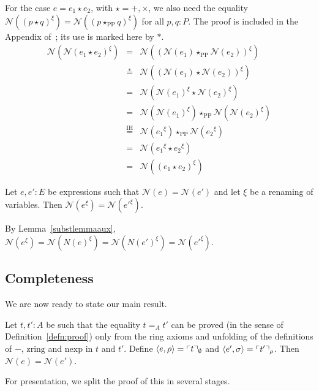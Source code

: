 \documentclass[numreferences]{kluwer}
\newcommand{\N}{\ensuremath{\mathcal{N}}}
\newcommand{\zring}{\ensuremath{\mathrm{zring}}}
\newcommand{\nexp}{\ensuremath{\mathrm{nexp}}}
\newcommand{\mlfn}[2]{\ensuremath\ulcorner{#1}\urcorner_{#2}}
\newcommand{\renamevar}[2]{\ensuremath{{#1}^{#2}}}
\newcommand{\starPP}{\ensuremath{\star_{\mathrm{PP}}}}
\begin{document}
\begin{article}
\begin{pf}
For the case $e=e_1\star e_2$, with $\star=+,\times$, we also need
the equality
$\N(\renamevar{(p\star q)}\xi)=\N(\renamevar{(p\starPP q)}\xi)$
for all $p,q:P$.  The proof is included in the Appendix
of~\cite{lcf:wie:04b}; its use is marked here by $\ast$.
\begin{eqnarray*}
\N(\renamevar{\N(e_1\star e_2)}\xi)
 & = & \N(\renamevar{(\N(e_1)\starPP\N(e_2))}\xi) \\
 & \stackrel\ast= & \N(\renamevar{(\N(e_1)\star\N(e_2))}\xi) \\
 & = & \N(\renamevar{\N(e_1)}\xi\star\renamevar{\N(e_2)}\xi) \\
 & = & \N(\renamevar{\N(e_1)}\xi)\starPP\N(\renamevar{\N(e_2)}\xi) \\
 & \stackrel{\mathrm{IH}}= & \N(\renamevar{e_1}\xi)\starPP\N(\renamevar{e_2}\xi) \\
 & = & \N(\renamevar{e_1}\xi\star\renamevar{e_2}\xi) \\
 & = & \N(\renamevar{(e_1\star e_2)}\xi)
\end{eqnarray*}
\end{pf}

\begin{theorem}\label{substlemma}
Let $e,e':E$ be expressions such that $\N(e)=\N(e')$ and let $\xi$ be
a renaming of variables.  Then $\N(\renamevar e\xi)=\N(\renamevar{e'}\xi)$.
\end{theorem}
\begin{pf}
By Lemma~\ref{substlemmaaux},
$\N(\renamevar e\xi)%
=\N(\renamevar{N(e)}\xi)%
=\N(\renamevar{N(e')}\xi)%
=\N(\renamevar{e'}\xi)$.
\end{pf}

\subsection{Completeness}

We are now ready to state our main result.

\begin{theorem}\label{completeness}
Let $t,t':A$ be such that the equality $t=_A t'$ can be proved (in the
sense of Definition~\ref{defn:proof}) only from the ring axioms and
unfolding of the definitions of $-$, $\zring$ and $\nexp$ in $t$ and
$t'$.  Define $\langle e,\rho\rangle=\mlfn{t}{\emptyset}$ and
$\langle e',\sigma\rangle=\mlfn{t'}{\rho}$.  Then $\N(e)=\N(e')$.
\end{theorem}

For presentation, we split the proof of this in several stages.


\end{article}
\end{document}
